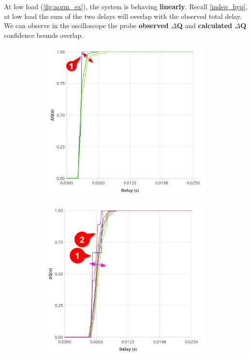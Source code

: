     At low load (\cref{fig:norm_ex}), the system is behaving \textbf{linearly}. Recall \cref{indep_hyp}, at low load the sum of the two delays will overlap with the observed total delay. We can observe in the oscilloscope the probe \textbf{observed $\Delta$Q} and \textbf{calculated $\Delta$Q} confidence bounds overlap. 
        \begin{figure}[H]
            \centering
            \begin{subfigure}{.5\textwidth}
                \centering
                \includegraphics[width=0.98\textwidth]{img/overload_2/50_workeran.png}
                \label{fig:norm_ex_1}
            \end{subfigure}%
            \begin{subfigure}{.5\textwidth}
                \centering
                \includegraphics[width =0.98\textwidth]{img/overload_2/50_probe2.png}

\end{subfigure}
\end{figure}
